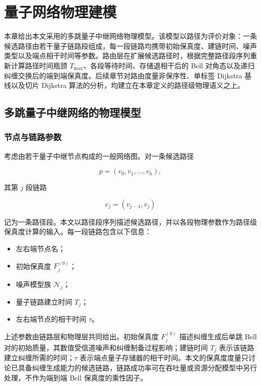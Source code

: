 %
%

\chapter{量子网络物理建模}
\label{chap:phymodel}

本章给出本文采用的多跳量子中继网络物理模型。该模型以路径为评价对象：一条候选路径由若干量子链路段组成，每一段链路均携带初始保真度、建链时间、噪声类型以及端点相干时间等参数。路由层在扩展候选路径时，根据完整路径段序列重新计算路径时间瓶颈 $T_{\max}$、各段等待时间、存储退相干后的 Bell 对角态以及递归纠缠交换后的端到端保真度。后续章节对路由度量非保序性、单标签 Dijkstra 基线以及切片 Dijkstra 算法的分析，均建立在本章定义的路径级物理语义之上。

\section{多跳量子中继网络的物理模型}
\label{sec:network-model}

\subsection{节点与链路参数}

考虑由若干量子中继节点构成的一般网络图。对一条候选路径

\[
p = (v_0, v_1, \ldots, v_h),
\]

其第 $j$ 段链路

\[
e_j = (v_{j-1}, v_j)
\]

记为一条路径段。本文以路径段序列描述候选路径，并以各段物理参数作为路径级保真度计算的输入。每一段链路包含以下信息：

\begin{itemize}
  \item 左右端节点名；
  \item 初始保真度 $F_j^{(0)}$；
  \item 噪声模型族 $\mathcal{N}_j$；
  \item 量子链路建立时间 $T_j$；
  \item 左右端节点的相干时间 $\tau$。
\end{itemize}

上述参数由链路层和物理层共同给出。初始保真度 $F_j^{(0)}$ 描述纠缠生成后单跳 Bell 对的初始质量，其数值受信道噪声和纠缠制备过程影响；建链时间 $T_j$ 表示该链路建立纠缠所需的时间；$\tau$ 表示端点量子存储器的相干时间。本文的保真度度量只讨论已具备纠缠生成能力的候选链路，链路成功率可在吞吐量或资源分配模型中另行处理，不作为端到端 Bell 保真度的乘性因子。

